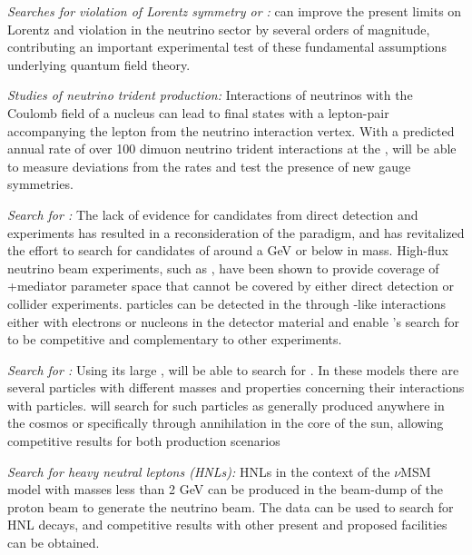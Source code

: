 \textit{Searches for violation of Lorentz symmetry or :}   can improve the present limits on Lorentz and  violation in the neutrino sector by several orders of magnitude, contributing an important experimental test of these fundamental assumptions underlying quantum field theory.

\textit{Studies of neutrino trident production:}  
Interactions of neutrinos with the Coulomb field of a 
nucleus can lead to final states with a lepton-pair 
accompanying the lepton from the neutrino interaction 
vertex. 
With a predicted annual rate of over 100 dimuon 
neutrino trident interactions at the ,  will be 
able to measure deviations from the  rates and test 
the presence of new gauge symmetries.

\textit{Search for :}  The lack of evidence for     
candidates from direct detection and  experiments has resulted in a reconsideration of the  paradigm, and has revitalized the effort to search for   candidates 
of around a GeV or below in mass. High-flux neutrino beam experiments, such as , have been shown to provide coverage of +mediator parameter space that cannot be covered by either direct detection or collider experiments.  particles can be detected in the  through -like interactions either with electrons or nucleons in the detector material and enable 's search for  to be competitive and complementary to other experiments.

\textit{Search for :} Using its large ,  will be able to search for  . In these models there are several   particles with different masses and
properties concerning their interactions with  particles.  will search for such particles 
as generally produced anywhere in the cosmos or specifically through annihilation 
in the core of the sun, allowing competitive results for both production scenarios

\textit{Search for heavy neutral leptons (HNLs):} HNLs in the context of the $\nu$MSM model with 
masses less than 2 GeV can be produced in the beam-dump of the proton beam to generate  the 
 neutrino beam.  The  data can be used to search for HNL decays, and competitive
results with other present and proposed facilities can be obtained.


